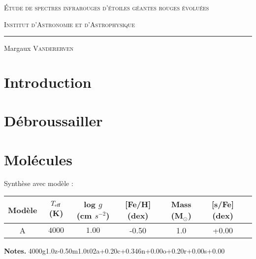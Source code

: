 \documentclass{article}
\begin{document}
\centering	
	{\LARGE \textsc{Étude de spectres infrarouges d'étoiles géantes rouges évoluées} \par}
	\vspace{0.5cm}
	{\textsc{Institut d'Astronomie et d'Astrophysique}}\par\vspace{0.1cm} \par 
	\rule{0.3\linewidth}{0.4pt} \par
	\vspace{0.5cm}
	Margaux \textsc{Vandererven}\par \vspace{0.7cm} \par 
	\vspace{0.cm}
	
	

\vspace{0.9cm}

\tableofcontents

\clearpage

\section{Introduction}

\section{Débroussailler}


\section{Molécules}

Synthèse avec modèle : 

\begin{table}[h!]
  \begin{center}
  \begin{tabular}{ccccccc}
      \hline
      \hline
      Modèle & $T_{\rm eff}$ (K) & log $g$ (cm $s^{-2}$) & [Fe/H] (dex) & Mass (M$_\odot$) & [s/Fe] (dex)\\
      \hline
      A &  $4000$ & $1.00$ & -0.50 & 1.0& +0.00 \\
      \hline
  \end{tabular}
  \end{center}
  \textbf{Notes.} 4000g1.0z-0.50m1.0t02a+0.20c+0.346n+0.00o+0.20r+0.00s+0.00
  \label{MARCS}
  \end{table}
\end{document}
